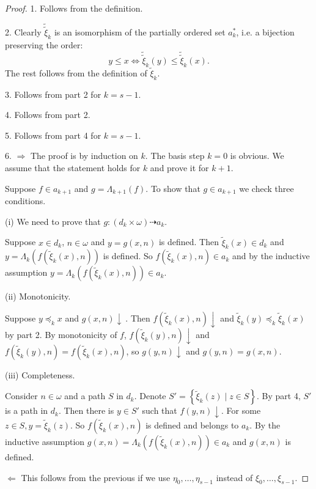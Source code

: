 \documentclass{asl}
\theoremstyle{definition}
\begin{document}
\begin{proof}
1. Follows from the definition.
\medskip

2. Clearly $\tilde{\tilde{\xi}}_k$ is an isomorphism of the partially ordered set $a_{k}^* $, i.e. a bijection preserving the order:
\[y\leqslant x\Leftrightarrow \tilde{\tilde{\xi}}_k(y) \leqslant \tilde{\tilde{\xi}}_k(x).\]
The rest follows from the definition of $\tilde{\xi}_k$.

3. Follows from part 2 for $k=s-1$.

4. Follows from part 2.

5. Follows from part 4 for $k=s-1$.

6. $ \Rightarrow $ The proof is by induction on $ k $. The basis step $k=0$ is obvious. We assume that the statement holds for $ k $ and prove it for $ k+1$. 

Suppose $ f\in  a_{k+1} $ and $g= \Lambda_{k+1}(f)  $. To show that $ g\in  a_{k+1} $ we check three conditions.

(i) We need to prove that $ g:(d_k \times\omega) \dashrightarrow a_k$. 

Suppose $ x\in d_k$, $ n\in\omega $ and $ y=g(x,n) $ is defined. Then $ \tilde{\xi}_{k} (x)\in d_k$ and $y=\Lambda_{k}\left( f\left( \tilde{\xi}_{k} (x),n  \right)  \right)  $ is defined. So $ f\left( \tilde{\xi}_{k} (x),n \right)  \in a_k $ and by the inductive assumption $ y=\Lambda_{k}\left( f\left( \tilde{\xi}_{k} (x),n  \right)  \right) \in a_k $.
\medskip

(ii) Monotonicity. 

Suppose $ y \preccurlyeq_k x $ and $ g(x,n)\downarrow\: $. Then $ f\left( \tilde{\xi}_{k} (x),n  \right)\downarrow$ and $ \tilde{\xi}_{k} (y) \preccurlyeq_k \tilde{\xi}_{k} (x) $ by part 2. By monotonicity of $ f $, $ f\left( \tilde{\xi}_{k} (y),n  \right)\downarrow$ and $ f\left( \tilde{\xi}_{k} (y),n  \right) = f\left( \tilde{\xi}_{k} (x),n  \right)$, so $ g(y,n)\downarrow $ and $g(y,n) = g(x,n)$.
\medskip

(iii) Completeness.

Consider $ n\in\omega $ and a path $S$ in $d_k$. Denote $ S'= \left\lbrace \tilde{\xi}_{k}(z) \mid z \in S \right\rbrace $. By part 4, $ S' $ is a path in $d_k$. Then there is $ y\in S' $ such that $ f(y,n) \! \downarrow $. For some $z\in S, y=\tilde{\xi}_{k} (z)$. So $ f\left( \tilde{\xi}_{k} (x),n  \right) $ is defined and belongs to $ a_k$. By the inductive assumption $ g(x,n)=\Lambda_{k} \left( f\left( \tilde{\xi}_{k} (x),n  \right)\right) \in a_{k} $ and $ g(x,n) $ is defined.
\medskip

$ \Leftarrow $ This follows from the previous if we use $\eta_{0},\ldots, \eta_{s-1} $ instead of $ \xi_{0},\ldots, \xi_{s-1}$.
\end{proof}
\end{document}
